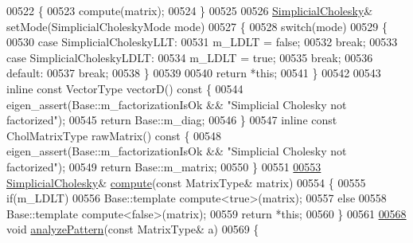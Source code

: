 \begin{DoxyCode}
00522     \{
00523       compute(matrix);
00524     \}
00525 
00526     \hyperlink{group___sparse_cholesky___module_class_eigen_1_1_simplicial_cholesky}{SimplicialCholesky}& setMode(SimplicialCholeskyMode mode)
00527     \{
00528       \textcolor{keywordflow}{switch}(mode)
00529       \{
00530       \textcolor{keywordflow}{case} SimplicialCholeskyLLT:
00531         m\_LDLT = \textcolor{keyword}{false};
00532         \textcolor{keywordflow}{break};
00533       \textcolor{keywordflow}{case} SimplicialCholeskyLDLT:
00534         m\_LDLT = \textcolor{keyword}{true};
00535         \textcolor{keywordflow}{break};
00536       \textcolor{keywordflow}{default}:
00537         \textcolor{keywordflow}{break};
00538       \}
00539 
00540       \textcolor{keywordflow}{return} *\textcolor{keyword}{this};
00541     \}
00542 
00543     \textcolor{keyword}{inline} \textcolor{keyword}{const} VectorType vectorD()\textcolor{keyword}{ const }\{
00544         eigen\_assert(Base::m\_factorizationIsOk && \textcolor{stringliteral}{"Simplicial Cholesky not factorized"});
00545         \textcolor{keywordflow}{return} Base::m\_diag;
00546     \}
00547     \textcolor{keyword}{inline} \textcolor{keyword}{const} CholMatrixType rawMatrix()\textcolor{keyword}{ const }\{
00548         eigen\_assert(Base::m\_factorizationIsOk && \textcolor{stringliteral}{"Simplicial Cholesky not factorized"});
00549         \textcolor{keywordflow}{return} Base::m\_matrix;
00550     \}
00551     
\hyperlink{group___sparse_cholesky___module_a7883b49a88b26162ba6d8b044e2ee75b}{00553}     \hyperlink{group___sparse_cholesky___module_class_eigen_1_1_simplicial_cholesky}{SimplicialCholesky}& \hyperlink{group___sparse_cholesky___module_a7883b49a88b26162ba6d8b044e2ee75b}{compute}(\textcolor{keyword}{const} MatrixType& matrix)
00554     \{
00555       \textcolor{keywordflow}{if}(m\_LDLT)
00556         Base::template compute<true>(matrix);
00557       \textcolor{keywordflow}{else}
00558         Base::template compute<false>(matrix);
00559       \textcolor{keywordflow}{return} *\textcolor{keyword}{this};
00560     \}
00561 
\hyperlink{group___sparse_cholesky___module_a6af3f64b855a96a2635302f863b5fd91}{00568}     \textcolor{keywordtype}{void} \hyperlink{group___sparse_cholesky___module_a6af3f64b855a96a2635302f863b5fd91}{analyzePattern}(\textcolor{keyword}{const} MatrixType& a)
00569     \{

\end{DoxyCode}

